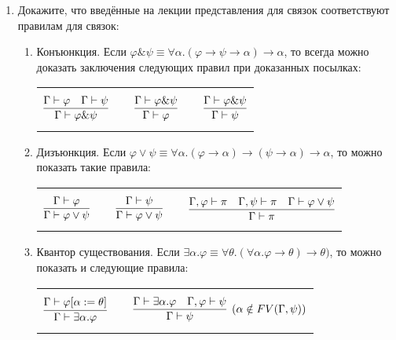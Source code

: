\documentclass[10pt,a4paper,oneside]{article}
\begin{document}
\begin{enumerate}
\item Докажите, что введённые на лекции представления для связок соответствуют правилам для связок:

\begin{enumerate} 
\item Конъюнкция. 
Если $\varphi \& \psi \equiv \forall \alpha.(\varphi\rightarrow\psi\rightarrow\alpha)\rightarrow\alpha$,
то всегда можно доказать заключения следующих правил при доказанных посылках:

\begin{center}\begin{tabular}{lp{0.5cm}lp{0.5cm}l}
$$\infer{\Gamma\vdash\varphi\&\psi}{\Gamma\vdash\varphi\quad\Gamma\vdash\psi}$$ &&
$$\infer{\Gamma\vdash\varphi}{\Gamma\vdash\varphi\&\psi}$$ &&
$$\infer{\Gamma\vdash\psi}{\Gamma\vdash\varphi\&\psi}$$
\end{tabular}\end{center}

\item Дизъюнкция.
Если $\varphi \vee \psi \equiv \forall \alpha.(\varphi\rightarrow\alpha)\rightarrow(\psi\rightarrow\alpha)\rightarrow\alpha$,
то можно показать такие правила:
\begin{center}\begin{tabular}{lp{0.5cm}lp{0.5cm}l}
$$\infer{\Gamma\vdash\varphi\vee\psi}{\Gamma\vdash\varphi}$$ &&
$$\infer{\Gamma\vdash\varphi\vee\psi}{\Gamma\vdash\psi}$$ &&
$$\infer{\Gamma\vdash\pi}{\Gamma,\varphi\vdash\pi\quad\Gamma,\psi\vdash\pi\quad\Gamma\vdash\varphi\vee\psi}$$
\end{tabular}\end{center}

\item Квантор существования.
Если $\exists \alpha.\varphi \equiv \forall \theta.(\forall\alpha.\varphi\rightarrow\theta)\rightarrow\theta)$, то
можно показать и следующие правила:

\begin{center}\begin{tabular}{lp{1cm}l}
$$\infer{\Gamma\vdash\exists \alpha.\varphi}{\Gamma\vdash\varphi[\alpha := \theta]}$$ &&
$$\infer[(\alpha\notin FV(\Gamma,\psi))]{\Gamma\vdash\psi}{\Gamma\vdash\exists\alpha.\varphi\quad\Gamma,\varphi\vdash\psi}$$
\end{tabular}\end{center}

\end{enumerate}
\end{enumerate}
\end{document}
